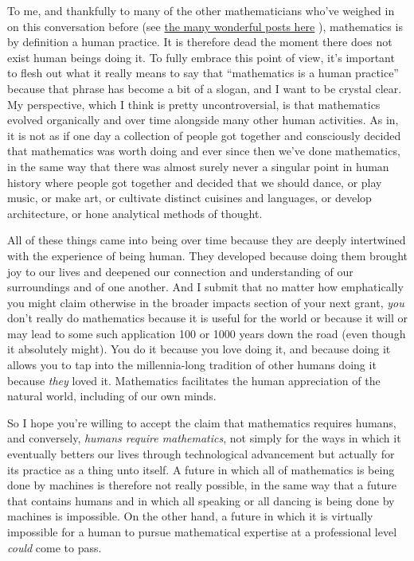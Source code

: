 \documentclass[11pt,reqno]{amsart}
\theoremstyle{plain}
\theoremstyle{definition}
\numberwithin{equation}{section}
\numberwithin{theorem}{section}
\begin{document}
To me, and thankfully to many of the other mathematicians who’ve weighed in on this conversation before (see \href{https://proofsandprompts.com/}{the many wonderful posts here} \cite{Blog:PAP}), mathematics is by definition a human practice. It is therefore dead the moment there does not exist human beings doing it. To fully embrace this point of view, it’s important to flesh out what it really means to say that ``mathematics is a human practice'' because that phrase has become a bit of a slogan, and I want to be crystal clear. My perspective, which I think is pretty uncontroversial, is that mathematics evolved organically and over time alongside many other human activities. As in, it is not as if one day a collection of people got together and consciously decided that mathematics was worth doing and ever since then we’ve done mathematics, in the same way that there was almost surely never a singular point in human history where people got together and decided that we should dance, or play music, or make art, or cultivate distinct cuisines and languages, or develop architecture, or hone analytical methods of thought.

All of these things came into being over time because they are deeply intertwined with the experience of being human. They developed because doing them brought joy to our lives and deepened our connection and understanding of our surroundings and of one another. And I submit that no matter how emphatically you might claim otherwise in the broader impacts section of your next grant, \textit{you} don’t really do mathematics because it is useful for the world or because it will or may lead to some such application 100 or 1000 years down the road (even though it absolutely might). You do it because you love doing it, and because doing it allows you to tap into the millennia-long tradition of other humans doing it because \textit{they} loved it. Mathematics facilitates the human appreciation of the natural world, including of our own minds. 

So I hope you’re willing to accept the claim that mathematics requires humans, and conversely, \textit{humans require mathematics}, not simply for the ways in which it eventually betters our lives through technological advancement but actually for its practice as a thing unto itself. A future in which all of mathematics is being done by machines is therefore not really possible, in the same way that a future that contains humans and in which all speaking or all dancing is being done by machines is impossible. On the other hand, a future in which it is virtually impossible for a human to pursue mathematical expertise at a professional level \textit{could} come to pass.
\end{document}
